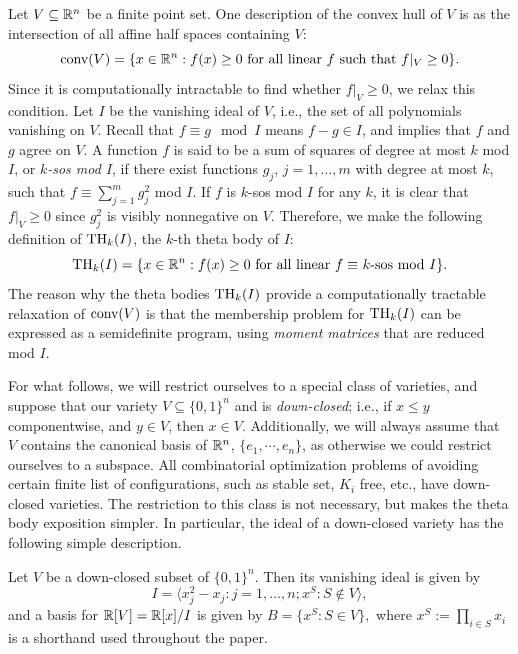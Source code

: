 Let $V \subseteq \mathbb{R}^n$ be a finite point set. One description of the convex hull of $V$ is as the intersection of all affine half spaces containing $V$:
$$\hbox{conv}(V) = \{x \in \mathbb{R}^n: f(x) \ge 0 \hbox{ for all linear $f$ such that } f|_V \ge 0\}.$$
Since it is computationally intractable to find whether $f|_V \ge 0$, we relax this condition. Let $I$ be the vanishing ideal of $V$, i.e., the set of all polynomials vanishing on $V$. Recall that $f \equiv g \mod I$ means $f - g \in I$, and implies that $f$ and $g$ agree on $V$. A function $f$ is said to be a sum of squares of degree at most $k$ mod $I$, or {\em $k$-sos mod $I$}, if there exist functions $g_j$, $j=1,\ldots,m$ with degree at most $k$, such that $f \equiv \sum_{j=1}^mg_j^2$ mod $I$. If $f$ is $k$-sos mod $I$ for any $k$, it is clear that $f|_V \ge 0$ since $g_j^2$ is visibly nonnegative on $V$. Therefore, we make the following definition of $\textup{TH}_k(I)$, the $k$-th theta body of $I$:
$$\textup{TH}_k(I) = \{x \in \mathbb{R}^n: f(x) \ge 0 \hbox{ for all linear $f \equiv$ $k$-sos mod $I$}\}.$$
The reason why the theta bodies $\textup{TH}_k(I)$ provide a computationally tractable relaxation of $\hbox{conv}(V)$ is that the membership problem for $\textup{TH}_k(I)$ can be expressed as a semidefinite program, using {\em moment matrices} that are reduced mod $I$. 

For what follows, we will restrict ourselves to a special class of varieties, and suppose that our variety $V \subseteq \{0,1\}^n$ and is {\em down-closed}; i.e., if $x\le y$ componentwise, and $y \in V$, then $x \in V$. Additionally, we will always assume that $V$ contains the canonical
basis of $\mathbb{R}^n$, $\{e_1, \cdots, e_n\}$, as otherwise we could restrict ourselves to a subspace. All combinatorial optimization problems of avoiding certain finite list of configurations, such as stable set, $K_i$ free, etc., have down-closed varieties. The restriction to this class is not necessary, but makes the theta body exposition simpler. In particular, the ideal of a down-closed variety has the following simple description.

\begin{lemma} \label{ideal}
Let $V$ be a down-closed subset of $\{0,1\}^n$. Then its vanishing ideal is given by
$$I=\langle x_j^2 - x_j: j = 1, \ldots, n;
x^S: S \notin V\rangle,$$ and a basis for $\mathbb{R}[V] = \mathbb{R}[x]/I$ is given by $B = \{x^S: S \in V\},$
where $x^S := \prod_{i \in S} x_i$ is a shorthand used throughout the paper.
\end{lemma}

